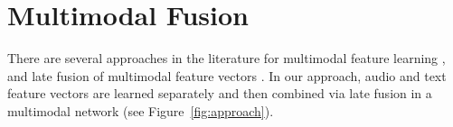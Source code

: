 



\section{Multimodal Fusion}\label{sec:cold-rec:multimodal}

There are several approaches in the literature for multimodal feature learning \citep{ngiam2011multimodal,srivastava2012learning}, and late fusion of multimodal feature vectors \citep{Bechet2015,Slizovskaia2017}. %
In our approach, audio and text feature vectors are learned separately and then combined via late fusion in a multimodal network (see Figure~\ref{fig:approach}).

